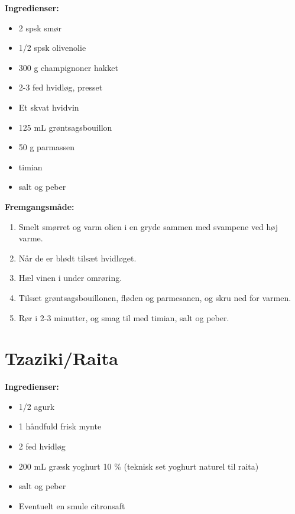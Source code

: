 \documentclass{book}
\begin{document}
\begin{minipage}[t]{0.5\textwidth}
\textbf{Ingredienser:}
\begin{itemize}
    \item 2 spsk smør
    \item 1/2 spsk olivenolie
    \item 300 g champignoner hakket 
    \item 2-3 fed hvidløg, presset
    \item Et skvat hvidvin
    \item 125 mL grøntsagsbouillon
    \item 50 g parmassen
    \item timian
    \item salt og peber
\end{itemize}
\end{minipage}
\begin{minipage}[t]{0.5\textwidth}
\textbf{Fremgangsmåde:}
\begin{enumerate}
    \item Smelt smørret og varm olien i en gryde sammen med svampene ved høj varme.
    \item Når de er blødt tilsæt hvidløget.
    \item Hæl vinen i under omrøring.
    \item Tilsæt grøntsagsbouillonen, fløden og parmesanen, og skru ned for varmen.
    \item Rør i 2-3 minutter, og smag til med timian, salt og peber.
\end{enumerate}
\end{minipage}
\newpage {}
\newpage \section{Tzaziki/Raita}
\begin{minipage}[t]{0.5\textwidth}
\textbf{Ingredienser:}
\begin{itemize}
    \item 1/2 agurk
    \item 1 håndfuld frisk mynte
    \item 2 fed hvidløg
    \item 200 mL græsk yoghurt 10 \% (teknisk set yoghurt naturel til raita)
    \item salt og peber
    \item Eventuelt en smule citronsaft
\end{itemize}
\end{minipage}
\end{document}
